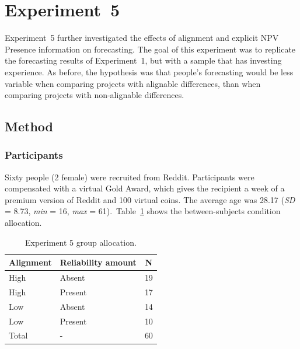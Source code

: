 \documentclass[a4paper, nobind, dvipsnames]{templates/ociamthesis}
\theoremstyle{definition}
\theoremstyle{definition}
\theoremstyle{definition}
\theoremstyle{definition}
\theoremstyle{remark}
\begin{document}
\hypertarget{alignment-4}{%
\section{Experiment~5}\label{alignment-4}}

Experiment~5 further investigated the effects of alignment and explicit NPV
Presence information on forecasting. The goal of this experiment was to
replicate the forecasting results of Experiment~1, but with a sample that has
investing experience. As before, the hypothesis was that people's forecasting
would be less variable when comparing projects with alignable differences, than
when comparing projects with non-alignable differences.

\subsection{Method}

\subsubsection{Participants}

Sixty people (2 female) were recruited from Reddit. Participants were compensated with a virtual Gold Award, which gives the recipient a week of a premium version of Reddit and 100 virtual coins. The average age was 28.17 (\emph{SD} = 8.73, \emph{min} = 16, \emph{max} = 61).~Table~\ref{tab:condition-allocation-alignment-4}
shows the between-subjects condition allocation.

\begin{table}[tbp]

\begin{center}
\begin{threeparttable}

\caption{\label{tab:condition-allocation-alignment-4}Experiment 5 group allocation.}

\begin{tabular}{lll}
\toprule
Alignment & \multicolumn{1}{c}{Reliability amount} & \multicolumn{1}{c}{N}\\
\midrule
High & Absent & 19\\
High & Present & 17\\
Low & Absent & 14\\
Low & Present & 10\\
Total & - & 60\\
\bottomrule
\end{tabular}

\end{threeparttable}
\end{center}

\end{table}
\end{document}
